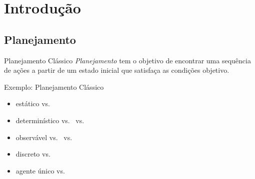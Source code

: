 \documentclass{beamer}
\begin{document}
\section{Introdução}

\subsection{Planejamento}
\begin{frame}{Planejamento Clássico}
\emph{Planejamento} tem o objetivo de encontrar uma \alert{sequência de ações} a partir de um \alert{estado inicial} que satisfaça as \alert{condições objetivo}.
    \begin{exampleblock}{\strut Exemplo: Planejamento Clássico}
      \begin{itemize}
      \item \alert{estático} vs.\ 
      \item \alert{determinístico} vs.\ 
        vs.\ 
      \item \alert{observável}
        vs.\ 
        vs.\ 
      \item \alert{discreto} vs.\ 
      \item \alert{agente único} vs.\ 
      \end{itemize}

    \end{exampleblock}
\end{frame}
\end{document}

